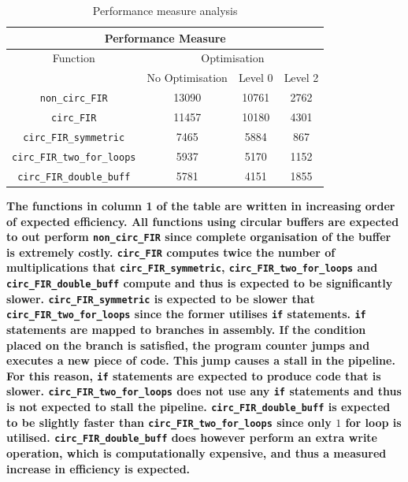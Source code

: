 \documentclass{article}
\begin{document}
\begin{table}[H]
  \centering
    \begin{tabular}{|c|c|c|c|}
    \hline
    \multicolumn{4}{|c|}{Performance Measure} \\
    \hline
    \multirow{}{}{Function} & \multicolumn{3}{c|}{Optimisation} \\
\cline{2-4}          & No Optimisation & Level 0 & Level 2 \\
    \hline
    {\tt non\_circ\_FIR} & 13090 & 10761 & 2762 \\
    \hline
    {\tt circ\_FIR} & 11457 & 10180 & 4301 \\
    \hline
    {\tt circ\_FIR\_symmetric} & 7465  & 5884  & 867 \\
    \hline
    {\tt circ\_FIR\_two\_for\_loops} & 5937  & 5170  & 1152 \\
    \hline
    {\tt circ\_FIR\_double\_buff} & 5781  & 4151 & 1855 \\
    \hline
    \end{tabular}%
  \caption{Performance measure analysis}
  \label{tab:performance_measure}%
\end{table}%

\textbf{The functions in column 1 of the table are written in increasing order of expected efficiency. All functions using circular buffers are expected to out perform {\tt non\_circ\_FIR} since complete organisation of the buffer is extremely costly. {\tt circ\_FIR} computes twice the number of multiplications that {\tt circ\_FIR\_symmetric}, {\tt circ\_FIR\_two\_for\_loops} and {\tt circ\_FIR\_double\_buff} compute and thus is expected to be significantly slower. {\tt circ\_FIR\_symmetric} is expected to be slower that {\tt circ\_FIR\_two\_for\_loops} since the former utilises {\tt if} statements. {\tt if} statements are mapped to branches in assembly. If the condition placed on the branch is satisfied, the program counter jumps and executes a new piece of code. This jump causes a stall in the pipeline. For this reason, {\tt if} statements are expected to produce code that is slower. {\tt circ\_FIR\_two\_for\_loops} does not use any {\tt if} statements and thus is not expected to stall the pipeline. {\tt circ\_FIR\_double\_buff} is expected to be slightly faster than {\tt circ\_FIR\_two\_for\_loops} since only $1$ for loop is utilised. {\tt circ\_FIR\_double\_buff} does however perform an extra write operation, which is computationally expensive, and thus a measured increase in efficiency is expected.} \\
\end{document}

